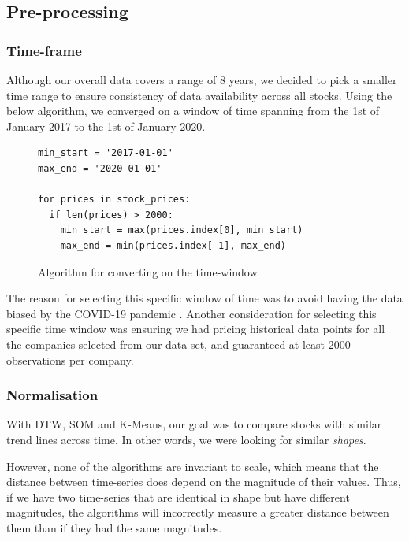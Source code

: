 \documentclass[11pt]{article}
\begin{document}
\subsection{Pre-processing}

\subsubsection{Time-frame}

Although our overall data covers a range of 8 years, we decided to pick a smaller time range to ensure consistency of data availability across all stocks. Using the below algorithm, we converged on a window of time spanning from the 1st of January 2017 to the 1st of January 2020.

\begin{figure}[H]
\centering

\begin{lstlisting}
min_start = '2017-01-01'
max_end = '2020-01-01'

for prices in stock_prices:
  if len(prices) > 2000:
    min_start = max(prices.index[0], min_start)
    max_end = min(prices.index[-1], max_end)
\end{lstlisting}
\caption{Algorithm for converting on the time-window}
\end{figure}

The reason for selecting this specific window of time was to avoid having the data biased by the COVID-19 pandemic \cite{covidMarkets} \cite{globalCovid}. Another consideration for selecting this specific time window was ensuring we had pricing historical data points for all the companies selected from our data-set, and guaranteed at least 2000 observations per company.


\subsubsection{Normalisation}

With DTW, SOM and K-Means, our goal was to compare stocks with similar trend lines across time. In other words, we were looking for similar \textit{shapes}.

However, none of the algorithms are invariant to scale, which means that the distance between time-series does depend on the magnitude of their values. Thus, if we have two time-series that are identical in shape but have different magnitudes, the algorithms will incorrectly measure a greater distance between them than if they had the same magnitudes. 
\end{document}
